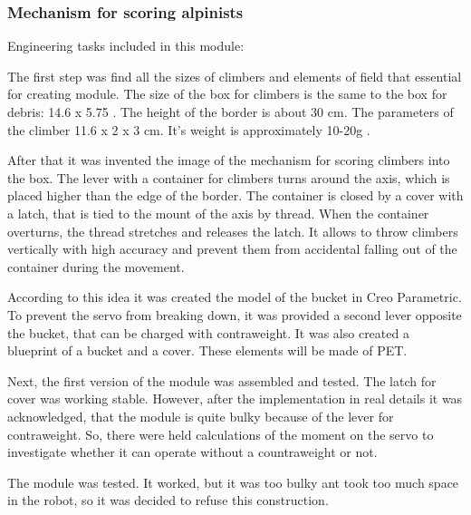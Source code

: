 \subsubsection{Mechanism for scoring alpinists}
  
  Engineering tasks included in this module:
  \begin{enumerate*}
    \item The first step was find all the sizes of climbers and elements of field that essential for creating module. The size of the box for climbers is the same to the box for debris: 14.6 x 5.75 . The height of the border is about 30 cm. The parameters of the climber 11.6 x 2 x 3 cm. It's weight is approximately 10-20g .
    
    \item After that it was invented the image of the mechanism for scoring climbers into the box. The lever with a container for climbers turns around the axis, which is placed higher than the edge of the border. The container is closed by a cover with a latch, that is tied to the mount of the axis by thread. When the container overturns, the thread stretches and releases the latch. It allows to throw climbers vertically with high accuracy and prevent them from accidental falling out of the container during the movement.
    
    \item According to this idea it was created the model of the bucket in Creo Parametric. To prevent the servo from breaking down, it was provided a second lever opposite the bucket, that can be charged with contraweight. It was also created a blueprint of a bucket and a cover. These elements will be made of PET.
    
    \item Next, the first version of the module was assembled and tested. The latch for cover was working stable. However, after the implementation in real details it was acknowledged, that the module is quite bulky because of the lever for contraweight. So, there were held calculations of the moment on the servo to investigate whether it can operate without a countraweight or not.
    
    \item The module was tested. It worked, but it was too bulky ant took too much space in the robot, so it was decided to refuse this construction.
  
  \end{enumerate*}	
  
  
  